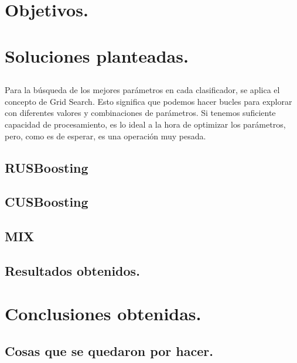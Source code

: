 \section{Objetivos.}


\section{Soluciones planteadas.}
\subsection{}
Para la búsqueda de los mejores parámetros en cada clasificador, se
aplica el concepto de Grid Search. Esto significa que podemos hacer bucles
para explorar con diferentes valores y combinaciones de parámetros. Si
tenemos suficiente capacidad de procesamiento, es lo ideal a la hora de
optimizar los parámetros, pero, como es de esperar, es una operación muy
pesada.
\subsection{RUSBoosting}
\begin{algorithm}
\end{algorithm}
\subsection{CUSBoosting}
\begin{algorithm}
\end{algorithm}
\subsection{MIX}
\subsection{Resultados obtenidos.}
\section{Conclusiones obtenidas.}
\subsection{Cosas que se quedaron por hacer.}
